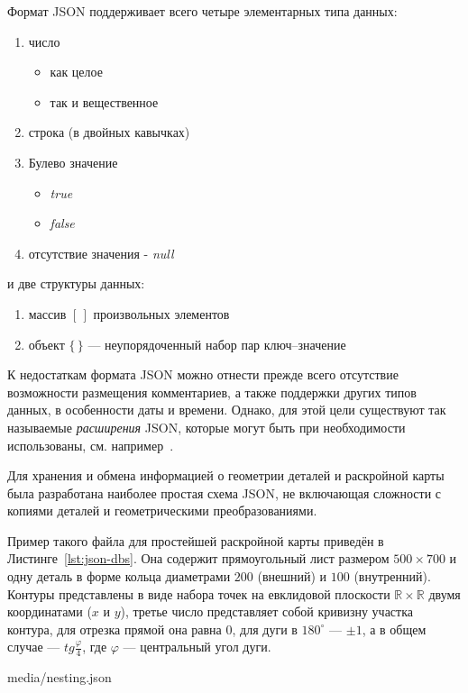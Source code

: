 Формат JSON
поддерживает всего четыре элементарных типа данных:
\begin{enumerate}
  \item число
  \begin{itemize}
    \item как целое
    \item так и вещественное
  \end{itemize}
  \item строка (в двойных кавычках)
  \item Булево значение
  \begin{itemize}
    \item \textit{true}
    \item \textit{false}
  \end{itemize}
  \item отсутствие значения - \textit{null}
\end{enumerate}
и две структуры данных:
\begin{enumerate}
  \item массив $[\,]$ произвольных элементов
  \item объект $\{\,\}$ --- неупорядоченный набор пар ключ--значение
\end{enumerate}

К недостаткам формата JSON
можно отнести прежде всего отсутствие
возможности размещения комментариев,
а также поддержки других
типов данных, в особенности даты и времени.
Однако,
для этой цели существуют так называемые
\textit{расширения} JSON,
которые могут быть при необходимости использованы,
см. например~\cite{bi:JSON5}.

Для хранения и обмена информацией о геометрии деталей
и раскройной карты
была разработана наиболее простая схема JSON,
не включающая сложности с копиями деталей и геометрическими
преобразованиями.

Пример такого файла для простейшей раскройной карты
приведён в Листинге~\ref{lst:json-dbs}.
Она содержит прямоугольный лист размером
$500 \times 700$
и одну деталь в форме кольца диаметрами
$200$ (внешний)
и $100$ (внутренний).
Контуры представлены в виде набора точек
на евклидовой плоскости
$\mathbb R \times \mathbb R$
двумя координатами
($x$ и $y$),
третье число представляет собой кривизну участка контура,
для отрезка прямой она равна $0$,
для дуги в $180^\circ$ --- $\pm 1$,
а в общем случае --- $tg \frac{\varphi}4$,
где $\varphi$ --- центральный угол дуги.


    {media/nesting.json}

